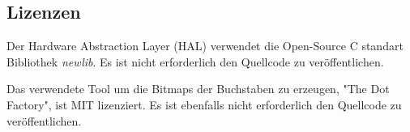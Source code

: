 \subsection{Lizenzen}\label{subsec:Lizenzen}
Der Hardware Abstraction Layer (HAL) verwendet die Open-Source C standart Bibliothek \textit{newlib}. Es ist nicht erforderlich den Quellcode zu veröffentlichen\cite{NIOS_II_soft}.

Das verwendete Tool um die Bitmaps der Buchstaben zu erzeugen, "The Dot Factory", ist MIT lizenziert. Es ist ebenfalls nicht erforderlich den Quellcode zu veröffentlichen. 
